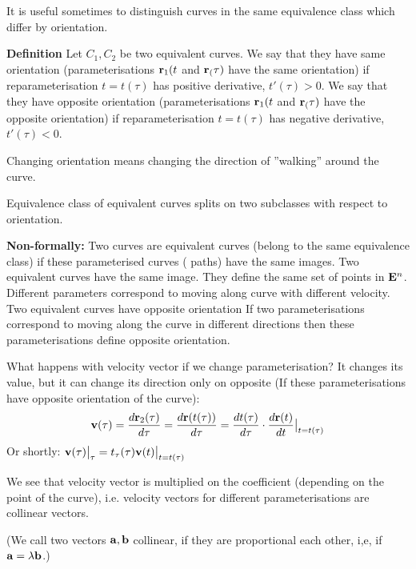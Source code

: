 \documentclass[12pt]{article}
\numberwithin{equation}{section}
\begin{document}
\smallskip

It is useful sometimes to distinguish curves in the same equivalence class which differ by orientation.



{\bf Definition}  Let $C_1,C_2$ be two equivalent curves.
We say that they have same orientation (parameterisations 
${\bf r}_1(t$  and ${\bf r}_(\tau)$
have the same orientation) if reparameterisation
$t=t(\tau)$ has positive derivative, $t'(\tau)>0$.
We say that they have opposite orientation (parameterisations ${\bf r}_1(t$  and ${\bf r}_(\tau)$
have the opposite orientation) if reparameterisation
$t=t(\tau)$ has negative  derivative, $t'(\tau)<0$.


 Changing orientation means changing the direction of ''walking'' around the curve.


  Equivalence class of equivalent curves splits on two 
subclasses with respect to orientation.

\smallskip

{\bf Non-formally:} Two curves are equivalent curves
(belong to the same equivalence class)
if these parameterised curves ( paths) have the
 same images. Two equivalent curves have the same image. They
define the same set of points
in ${\bf E}^n$. Different parameters correspond to moving along curve
with different velocity.  Two equivalent curves have opposite orientation
If  two parameterisations  correspond to moving along the curve in different directions
then these parameterisations define opposite orientation.



What happens with velocity vector if we change parameterisation?
It  changes its value,  but it can change its direction only on opposite  (If these parameterisations have opposite
 orientation of the curve):
\begin{equation}\label{changingofvelocity}
       {{\bf v}}(\tau)=
       {d{\bf r}_2(\tau)\over d\tau}=
         {d{\bf r}(t(\tau))\over d\tau}=
           {dt(\tau)\over d\tau}
                     \cdot
            {d{\bf r}(t)\over dt}\big\vert_{t=t(\tau)}
\end{equation}
Or shortly:  ${{\bf v}}(\tau)\big\vert_{\tau}=t_\tau(\tau){\bf v}(t)\big\vert_{t=t(\tau)}$

We see that velocity vector is multiplied on the coefficient (depending on the point of the curve),
i.e. velocity vectors for different parameterisations are collinear vectors.

\noindent (We call two vectors ${\bf a},{\bf b}$ collinear, if they 
are proportional each other, i,e,
if ${\bf a}=\lambda{\bf b}$.)
\bigskip
\end{document}
